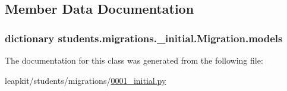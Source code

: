 \subsection{Member Data Documentation}
\hypertarget{classstudents_1_1migrations_1_10001__initial_1_1_migration_a6bf5c96d511e88a3ab94d17c1e40434f}{
\subsubsection[{models}]{\setlength{\rightskip}{0pt plus 5cm}dictionary students.\-migrations.\-\_\-initial.\-Migration.\-models\hspace{0.3cm}{\ttfamily [static]}}}\label{classstudents_1_1migrations_1_10001__initial_1_1_migration_a6bf5c96d511e88a3ab94d17c1e40434f}


The documentation for this class was generated from the following file\-:\begin{DoxyCompactItemize}
\item 
leapkit/students/migrations/\hyperlink{0001__initial_8py}{0001\-\_\-initial.\-py}\end{DoxyCompactItemize}
